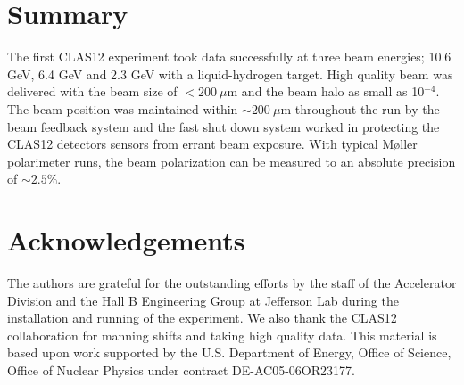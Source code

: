 \documentclass[final,3p,times,twocolumn]{elsarticle}
\begin{document}

\newpage

\linenumbers









\section{Summary}

The first CLAS12 experiment took data successfully at three beam energies; 10.6 GeV, 6.4 GeV and 2.3 GeV with a liquid-hydrogen 
target. High quality beam was delivered with the beam size of $< 200~\mu$m and the beam halo as small as 10$^{-4}$. The beam 
position was maintained within $\sim 200~\mu$m throughout the run  by the beam feedback system and the fast shut down system 
worked in protecting the CLAS12 detectors sensors from errant beam exposure. With typical M{\o}ller polarimeter runs, the beam 
polarization can be measured to an absolute precision of $\sim 2.5\%$. 

\section{Acknowledgements}

The authors are grateful for the outstanding efforts by the staff of the Accelerator Division and the Hall B Engineering Group at Jefferson Lab during the installation and running of the experiment. We also thank the CLAS12 collaboration for manning shifts and taking high quality data.
This material is based upon work supported by the U.S. Department of Energy, Office of Science, Office of Nuclear Physics under contract DE-AC05-06OR23177.





%


%


\end{document}
